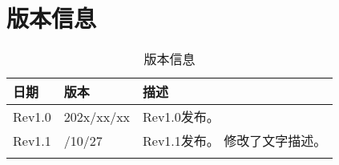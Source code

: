 

\clearpage
\hypertarget{revhis}{}%
\section{版本信息}

\begin{center}
	\begin{longtable}[H]{|>{\raggedright\arraybackslash}p{1.5cm}|>{\raggedright\arraybackslash}p{2.5cm}|
        >{\raggedright\arraybackslash}p{11cm}|}
		\toprule
		\textbf{日期}}    & \textbf{版本}  & \textbf{描述}}  \\ \endhead
		\hline
		Rev1.0 & 202x/xx/xx & Rev1.0发布。
		\\
        \hline
		Rev1.1 & 2023/10/27 & Rev1.1发布。
							  \newline{}修改了文字描述。
		\\
        \hline
		\caption{版本信息}
		\label{tbl:dsrevinfo}
	\end{longtable}
\end{center} \par


